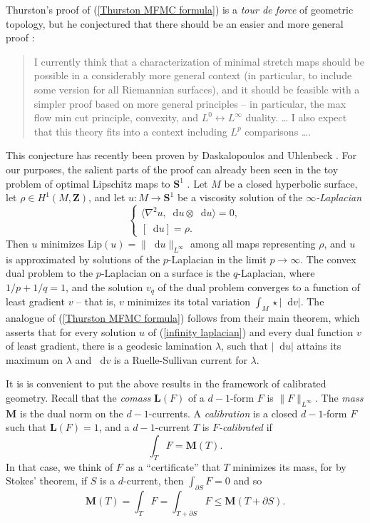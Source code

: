 \documentclass[reqno,11pt]{amsart}
\newcommand{\ZZ}{\mathbf{Z}}
\newcommand{\Sph}{\mathbf S}
\newcommand*\dif{\mathop{}\!\mathrm{d}}
\newcommand{\Lip}{\mathrm{Lip}}
\newcommand{\Mass}{\mathbf M}
\newcommand{\Comass}{\mathbf L}
\newcommand{\dfn}[1]{\emph{#1}\index{#1}}
\theoremstyle{definition}
\numberwithin{equation}{section}
\begin{document}
Thurston's proof of (\ref{Thurston MFMC formula}) is a \emph{tour de force} of geometric topology, but he conjectured that there should be an easier and more general proof \cite[Abstract]{Thurston98}:

\begin{quote}
I currently think that a characterization of minimal stretch maps should be possible in a considerably more general context (in particular, to include some version for all Riemannian surfaces), and it should be feasible with a simpler proof based on more general principles -- in particular, the max flow min cut principle, convexity, and $L^0 \leftrightarrow L^\infty$ duality. \dots
I also expect that this theory fits into a context including $L^p$ comparisons \dots. 
\end{quote}

This conjecture has recently been proven by Daskalopoulos and Uhlenbeck \cite{daskalopoulos2022,daskalopoulos2023,uhlenbeck2023noether}.
For our purposes, the salient parts of the proof can already been seen in the toy problem of optimal Lipschitz maps to $\Sph^1$ \cite{daskalopoulos2020transverse}.
Let $M$ be a closed hyperbolic surface, let $\rho \in H^1(M, \ZZ)$, and let $u: M \to \Sph^1$ be a viscosity solution of the \dfn{$\infty$-Laplacian}
\begin{equation}\label{infinity laplacian}\begin{cases}
\langle \nabla^2 u, \dif u \otimes \dif u\rangle = 0, \\
[\dif u] = \rho.
\end{cases}\end{equation}
Then $u$ minimizes $\Lip(u) = \|\dif u\|_{L^\infty}$ among all maps representing $\rho$, and $u$ is approximated by solutions of the $p$-Laplacian in the limit $p \to \infty$.
The convex dual problem to the $p$-Laplacian on a surface is the $q$-Laplacian, where $1/p + 1/q = 1$, and the solution $v_q$ of the dual problem converges to a function of least gradient $v$ -- that is, $v$ minimizes its total variation $\int_M \star |\dif v|$.
The analogue of (\ref{Thurston MFMC formula}) follows from their main theorem, which asserts that for every solution $u$ of (\ref{infinity laplacian}) and every dual function $v$ of least gradient, there is a geodesic lamination $\lambda$, such that $|\dif u|$ attains its maximum on $\lambda$ and $\dif v$ is a Ruelle-Sullivan current for $\lambda$.

It is is convenient to put the above results in the framework of calibrated geometry.
Recall that the \dfn{comass} $\Comass(F)$ of a $d - 1$-form $F$ is $\|F\|_{L^\infty}$.
The \dfn{mass} $\Mass$ is the dual norm on the $d - 1$-currents.
A \dfn{calibration} is a closed $d - 1$-form $F$ such that $\Comass(F) = 1$, and a $d - 1$-current $T$ is \dfn{$F$-calibrated} if 
$$\int_T F = \Mass(T).$$
In that case, we think of $F$ as a ``certificate'' that $T$ minimizes its mass, for by Stokes' theorem, if $S$ is a $d$-current, then $\int_{\partial S} F = 0$ and so
$$\Mass(T) = \int_T F = \int_{T + \partial S} F \leq \Mass(T + \partial S).$$
\end{document}
